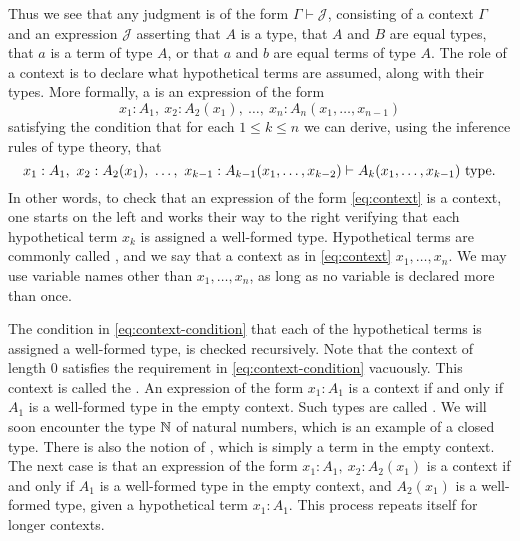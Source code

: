 Thus we see that any judgment is of the form $\Gamma\vdash\mathcal{J}$, consisting of a context $\Gamma$ and an expression $\mathcal{J}$ asserting that $A$ is a type, that $A$ and $B$ are equal types, that $a$ is a term of type $A$, or that $a$ and $b$ are equal terms of type $A$. The role of a context is to declare what hypothetical terms are assumed, along with their types. More formally, a  is an expression of the form
\begin{equation}\label{eq:context}
x_1:A_1,~x_2:A_2(x_1),~\ldots,~x_n:A_n(x_1,\ldots,x_{n-1})
\end{equation}
satisfying the condition that for each $1\leq k\leq n$ we can derive, using the inference rules of type theory, that
\begin{equation}\label{eq:context-condition}
  x_1:A_1,~x_2:A_2(x_1),~\ldots,~x_{k-1}:A_{k-1}(x_1,\ldots,x_{k-2})\vdash A_k(x_1,\ldots,x_{k-1})~\mathrm{type}.
\end{equation}
In other words, to check that an expression of the form \cref{eq:context} is a context, one starts on the left and works their way to the right verifying that each hypothetical term $x_k$ is assigned a well-formed type. Hypothetical terms are commonly called , and we say that a context as in \cref{eq:context}  $x_1,\ldots,x_n$. We may use variable names other than $x_1,\ldots,x_n$, as long as no variable is declared more than once.

The condition in \cref{eq:context-condition} that each of the hypothetical terms is assigned a well-formed type, is checked recursively. Note that the context of length $0$ satisfies the requirement in \cref{eq:context-condition} vacuously. This context is called the . An expression of the form $x_1:A_1$ is a context if and only if $A_1$ is a well-formed type in the empty context. Such types are called . We will soon encounter the type ${\mathbb{N}}$ of natural numbers, which is an example of a closed type. There is also the notion of , which is simply a term in the empty context. The next case is that an expression of the form $x_1:A_1,~x_2:A_2(x_1)$ is a context if and only if $A_1$ is a well-formed type in the empty context, and $A_2(x_1)$ is a well-formed type, given a hypothetical term $x_1:A_1$. This process repeats itself for longer contexts.


